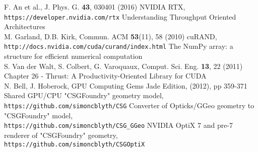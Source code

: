 \documentclass{webofc}
\begin{document}
\begin{thebibliography}{}
F. An et al., J. Phys. G. {\bf 43}, 030401 (2016) 
%
NVIDIA RTX, {\tt https://developer.nvidia.com/rtx}
%
%
%
Understanding Throughput Oriented Architectures \\
M. Garland, D.B. Kirk, Commun. ACM {\bf 53}(11), 58 (2010) 
%
cuRAND, {\tt http://docs.nvidia.com/cuda/curand/index.html}
%
The NumPy array: a structure for efficient numerical computation \\
S. Van der Walt, S. Colbert, G. Varoquaux, Comput. Sci. Eng. {\bf 13}, 22 (2011)
%
Chapter 26 - Thrust: A Productivity-Oriented Library for CUDA \\
N. Bell, J. Hoberock, GPU Computing Gems Jade Edition, (2012), pp 359-371
%
Shared GPU/CPU "CSGFoundry" geometry model,\\ {\tt https://github.com/simoncblyth/CSG}
%
Converter of Opticks/GGeo geometry to "CSGFoundry" model,\\ {\tt https://github.com/simoncblyth/CSG\_GGeo}
%
NVIDIA OptiX 7 and pre-7 renderer of "CSGFoundry" geometry,\\ {\tt https://github.com/simoncblyth/CSGOptiX}
%
\end{thebibliography}
%
\end{document}
